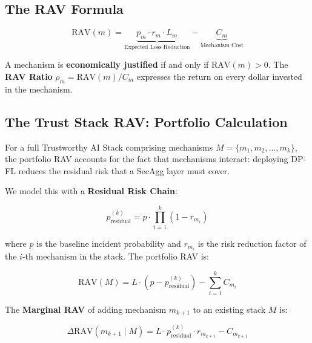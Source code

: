 \subsection{The RAV Formula}
\label{subsec:rav-formula}

\begin{tcolorbox}[formulabox,
  title={Definition: Risk-Adjusted Value of Trust}]
\begin{equation}
  \label{eq:rav}
  \mathrm{RAV}(m)
    = \underbrace{p_m \cdot r_m \cdot L_m}_{
        \text{Expected Loss Reduction}}
    - \underbrace{C_m}_{\text{Mechanism Cost}}
\end{equation}

A mechanism is \textbf{economically justified} if and only if
$\mathrm{RAV}(m) > 0$.
The \textbf{RAV Ratio} $\rho_m = \mathrm{RAV}(m) / C_m$
expresses the return on every dollar invested in the mechanism.
\end{tcolorbox}

\subsection{The Trust Stack RAV: Portfolio Calculation}
\label{subsec:rav-portfolio}

For a full Trustworthy AI Stack comprising mechanisms
$M = \{m_1, m_2, \ldots, m_k\}$, the portfolio RAV accounts
for the fact that mechanisms interact: deploying DP-FL reduces
the residual risk that a SecAgg layer must cover.

We model this with a \textbf{Residual Risk Chain}:

\begin{equation}
  \label{eq:residual-risk}
  p_{\mathrm{residual}}^{(k)}
    = p \cdot \prod_{i=1}^{k} (1 - r_{m_i})
\end{equation}

where $p$ is the baseline incident probability and
$r_{m_i}$ is the risk reduction factor of the $i$-th
mechanism in the stack.
The portfolio RAV is:

\begin{equation}
  \label{eq:portfolio-rav}
  \mathrm{RAV}(M)
    = L \cdot \left(
        p - p_{\mathrm{residual}}^{(k)}
      \right)
    - \sum_{i=1}^{k} C_{m_i}
\end{equation}

The \textbf{Marginal RAV} of adding mechanism $m_{k+1}$ to an
existing stack $M$ is:

\begin{equation}
  \label{eq:marginal-rav}
  \Delta\mathrm{RAV}(m_{k+1} \mid M)
    = L \cdot p_{\mathrm{residual}}^{(k)} \cdot r_{m_{k+1}}
    - C_{m_{k+1}}
\end{equation}


